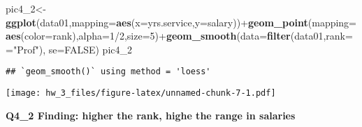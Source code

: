 \documentclass[]{article}
\newenvironment{Shaded}{\begin{snugshade}}{\end{snugshade}}
\newcommand{\KeywordTok}[1]{\textcolor[rgb]{0.13,0.29,0.53}{\textbf{{#1}}}}
\newcommand{\DataTypeTok}[1]{\textcolor[rgb]{0.13,0.29,0.53}{{#1}}}
\newcommand{\DecValTok}[1]{\textcolor[rgb]{0.00,0.00,0.81}{{#1}}}
\newcommand{\StringTok}[1]{\textcolor[rgb]{0.31,0.60,0.02}{{#1}}}
\newcommand{\OtherTok}[1]{\textcolor[rgb]{0.56,0.35,0.01}{{#1}}}
\newcommand{\NormalTok}[1]{{#1}}
\begin{document}
\begin{Shaded}
\begin{Highlighting}[]
\NormalTok{pic4_2<-}\KeywordTok{ggplot}\NormalTok{(data01,}\DataTypeTok{mapping=}\KeywordTok{aes}\NormalTok{(}\DataTypeTok{x=}\NormalTok{yrs.service,}\DataTypeTok{y=}\NormalTok{salary))+}\KeywordTok{geom_point}\NormalTok{(}\DataTypeTok{mapping=}\KeywordTok{aes}\NormalTok{(}\DataTypeTok{color=}\NormalTok{rank),}\DataTypeTok{alpha=}\DecValTok{1}\NormalTok{/}\DecValTok{2}\NormalTok{,}\DataTypeTok{size=}\DecValTok{5}\NormalTok{)+}\KeywordTok{geom_smooth}\NormalTok{(}\DataTypeTok{data=}\KeywordTok{filter}\NormalTok{(data01,rank==}\StringTok{"Prof"}\NormalTok{), }\DataTypeTok{se=}\OtherTok{FALSE}\NormalTok{)}
\NormalTok{pic4_2}
\end{Highlighting}
\end{Shaded}

\begin{verbatim}
## `geom_smooth()` using method = 'loess'
\end{verbatim}

\texttt{[image: hw\_3\_files/figure-latex/unnamed-chunk-7-1.pdf]}

\textbf{Q4\_2 Finding: higher the rank, highe the range in salaries}
\end{document}
